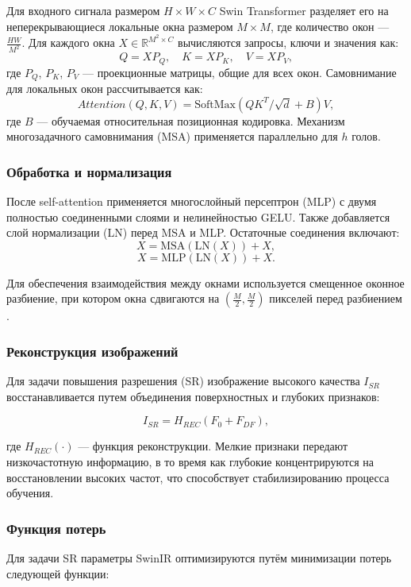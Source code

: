 \documentclass[14pt]{extarticle}
\begin{document}
Для входного сигнала размером $H \times W \times C$ Swin Transformer разделяет его на неперекрывающиеся локальные окна размером $M \times M$, где количество окон — $\frac{HW}{M^2}$. Для каждого окна $X \in \mathbb{R}^{M^2 \times C}$ вычисляются запросы, ключи и значения как:
$$
    Q = XP_Q, \quad K = XP_K, \quad V = XP_V,
$$
где $P_Q$, $P_K$, $P_V$ — проекционные матрицы, общие для всех окон. Самовнимание для локальных окон рассчитывается как:
$$
    Attention(Q, K, V) = \text{SoftMax}(QK^T / \sqrt{d} + B)V,
$$
где $B$ — обучаемая относительная позиционная кодировка. Механизм многозадачного самовнимания (MSA) применяется параллельно для $h$ голов.

\subsubsection{Обработка и нормализация}

После self-attention применяется многослойный персептрон (MLP) с двумя полностью соединенными слоями и нелинейностью GELU. Также добавляется слой нормализации (LN) перед MSA и MLP. Остаточные соединения включают:
$$
    X = \text{MSA}(\text{LN}(X)) + X,
$$
$$
    X = \text{MLP}(\text{LN}(X)) + X.
$$

Для обеспечения взаимодействия между окнами используется смещенное оконное разбиение, при котором окна сдвигаются на $(\frac{M}{2}, \frac{M}{2})$ пикселей перед разбиением \cite{liu2021swintransformerhierarchicalvision}.

\subsubsection{Реконструкция изображений}

Для задачи повышения разрешения (SR) изображение высокого качества $I_{SR}$ восстанавливается путем объединения поверхностных и глубоких признаков:

$$
    I_{SR} = H_{REC}(F_0 + F_{DF}),
$$

где $H_{REC}(\cdot)$ — функция реконструкции. Мелкие признаки передают низкочастотную информацию, в то время как глубокие концентрируются на восстановлении высоких частот, что способствует стабилизированию процесса обучения.


\subsubsection{Функция потерь}

Для задачи SR параметры SwinIR оптимизируются путём минимизации потерь следующей функции:
\end{document}
